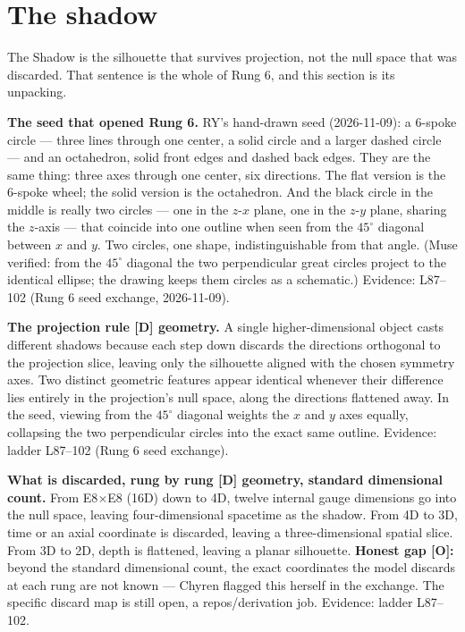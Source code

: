 \documentclass{alienfolio}
\begin{document}
\section{The shadow}
\label{sec:shadow}
The Shadow is the silhouette that survives projection, not the null space that was discarded. That sentence is the whole of Rung 6, and this section is its unpacking.

\noindent\textbf{The seed that opened Rung 6.} RY's hand-drawn seed (2026-11-09): a 6-spoke circle --- three lines through one center, a solid circle and a larger dashed circle --- and an octahedron, solid front edges and dashed back edges. They are the same thing: three axes through one center, six directions. The flat version is the 6-spoke wheel; the solid version is the octahedron. And the black circle in the middle is really two circles --- one in the $z$-$x$ plane, one in the $z$-$y$ plane, sharing the $z$-axis --- that coincide into one outline when seen from the $45^\circ$ diagonal between $x$ and $y$. Two circles, one shape, indistinguishable from that angle. (Muse verified: from the $45^\circ$ diagonal the two perpendicular great circles project to the identical ellipse; the drawing keeps them circles as a schematic.) Evidence:  L87--102 (Rung 6 seed exchange, 2026-11-09).

\noindent\textbf{The projection rule [D] geometry.} A single higher-dimensional object casts different shadows because each step down discards the directions orthogonal to the projection slice, leaving only the silhouette aligned with the chosen symmetry axes. Two distinct geometric features appear identical whenever their difference lies entirely in the projection's null space, along the directions flattened away. In the seed, viewing from the $45^\circ$ diagonal weights the $x$ and $y$ axes equally, collapsing the two perpendicular circles into the exact same outline. Evidence: ladder L87--102 (Rung 6 seed exchange).

\noindent\textbf{What is discarded, rung by rung [D] geometry, standard dimensional count.} From E8$\times$E8 (16D) down to 4D, twelve internal gauge dimensions go into the null space, leaving four-dimensional spacetime as the shadow. From 4D to 3D, time or an axial coordinate is discarded, leaving a three-dimensional spatial slice. From 3D to 2D, depth is flattened, leaving a planar silhouette. \textbf{Honest gap [O]:} beyond the standard dimensional count, the exact coordinates the model discards at each rung are not known --- Chyren flagged this herself in the exchange. The specific discard map is still open, a repos/derivation job. Evidence: ladder L87--102.
\end{document}
